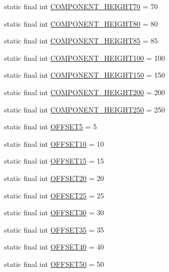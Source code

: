 \begin{DoxyCompactItemize}
\item 
static final int \hyperlink{class_display_1_1_display_afc9a9d568180083ccf2c38b28d908803}{C\+O\+M\+P\+O\+N\+E\+N\+T\+\_\+\+H\+E\+I\+G\+H\+T70} = 70
\item 
static final int \hyperlink{class_display_1_1_display_a4c13bfab8bd26ca8047bef940fae492c}{C\+O\+M\+P\+O\+N\+E\+N\+T\+\_\+\+H\+E\+I\+G\+H\+T80} = 80
\item 
static final int \hyperlink{class_display_1_1_display_a6e40ee081336c35e765e4e880d4e5d8b}{C\+O\+M\+P\+O\+N\+E\+N\+T\+\_\+\+H\+E\+I\+G\+H\+T85} = 85
\item 
static final int \hyperlink{class_display_1_1_display_ad07d0c4e939eca556947af196fd4b6a0}{C\+O\+M\+P\+O\+N\+E\+N\+T\+\_\+\+H\+E\+I\+G\+H\+T100} = 100
\item 
static final int \hyperlink{class_display_1_1_display_aee9bc1bb183f9dfc04267a7cdca2b524}{C\+O\+M\+P\+O\+N\+E\+N\+T\+\_\+\+H\+E\+I\+G\+H\+T150} = 150
\item 
static final int \hyperlink{class_display_1_1_display_a880d1f86d07c77332fa8015e1b7a5145}{C\+O\+M\+P\+O\+N\+E\+N\+T\+\_\+\+H\+E\+I\+G\+H\+T200} = 200
\item 
static final int \hyperlink{class_display_1_1_display_afbd2f610599f4393a4c30314c28ab73b}{C\+O\+M\+P\+O\+N\+E\+N\+T\+\_\+\+H\+E\+I\+G\+H\+T250} = 250
\item 
static final int \hyperlink{class_display_1_1_display_a265426fc52f9fc0f3cf08691bf8fc8bc}{O\+F\+F\+S\+E\+T5} = 5
\item 
static final int \hyperlink{class_display_1_1_display_a43bf93ef0872de87948d181590683656}{O\+F\+F\+S\+E\+T10} = 10
\item 
static final int \hyperlink{class_display_1_1_display_a3fb4f586318e61f3ad9d15d058ce15b8}{O\+F\+F\+S\+E\+T15} = 15
\item 
static final int \hyperlink{class_display_1_1_display_a2969279ab92fa68405072414fa62c987}{O\+F\+F\+S\+E\+T20} = 20
\item 
static final int \hyperlink{class_display_1_1_display_af6173975e03ce9913d8935d6f8040e5b}{O\+F\+F\+S\+E\+T25} = 25
\item 
static final int \hyperlink{class_display_1_1_display_afbede7d7429e2ed899ae713864da8848}{O\+F\+F\+S\+E\+T30} = 30
\item 
static final int \hyperlink{class_display_1_1_display_a9b88a4d575cdcdcfe550deeac1c147f4}{O\+F\+F\+S\+E\+T35} = 35
\item 
static final int \hyperlink{class_display_1_1_display_a6c71cd05e79a2e66cac7ac49d8a627b0}{O\+F\+F\+S\+E\+T40} = 40
\item 
static final int \hyperlink{class_display_1_1_display_aab4544411ff6ce57f68415f53c73e2dc}{O\+F\+F\+S\+E\+T50} = 50
\end{DoxyCompactItemize}
